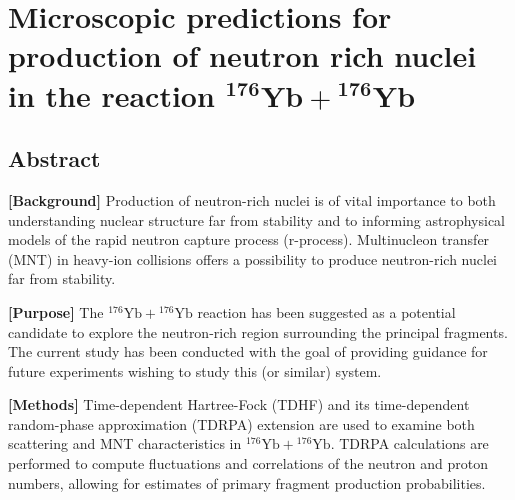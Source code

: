 
\chapter{Microscopic predictions for production of neutron rich nuclei in the reaction $^\mathbf{176}\mathbf{Yb}+{}^\mathbf{176}\mathbf{Yb}$}\label{chapters:chapter_8}
\vspace{-7mm}

\author{K. Godbey}
\author{C. Simenel}
\author{A. S. Umar}




\section*{Abstract}

		{\bf [Background]}
		Production of neutron-rich nuclei is of vital importance to both understanding nuclear structure far from stability and to informing astrophysical models of the rapid neutron capture process (r-process). Multinucleon transfer (MNT) in heavy-ion collisions offers a possibility to produce neutron-rich nuclei far from stability.
		
		{\bf [Purpose]}
		The $^{176}\mathrm{Yb}+{}^{176}\mathrm{Yb}$ reaction has been suggested as a potential candidate to explore the neutron-rich region surrounding the principal fragments. The current study has been conducted with the goal of providing guidance for future experiments wishing to study this (or similar) system.
		
		{\bf [Methods]}
		Time-dependent Hartree-Fock (TDHF) and its time-dependent random-phase approximation (TDRPA) extension are used to examine both scattering and MNT characteristics in $^{176}\mathrm{Yb}+{}^{176}\mathrm{Yb}$. TDRPA calculations are performed to compute fluctuations and correlations of the neutron and proton numbers, allowing for estimates of primary fragment production probabilities. 
		
